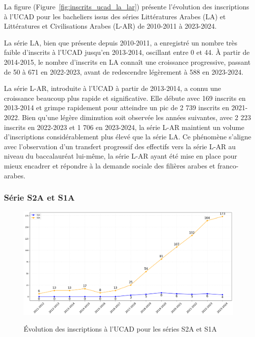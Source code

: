 La figure (Figure~\ref{fig:inscrits_ucad_la_lar}) présente l'évolution des inscriptions à l'UCAD pour les bacheliers issus des séries Littératures Arabes (LA) et Littératures et Civilisations Arabes (L-AR) de 2010-2011 à 2023-2024.

La série LA, bien que présente depuis 2010-2011, a enregistré un nombre très faible d'inscrits à l'UCAD jusqu'en 2013-2014, oscillant entre 0 et 44. 
À partir de 2014-2015, le nombre d'inscrits en LA connaît une croissance progressive, passant de 50 à 671 en 2022-2023, avant de redescendre légèrement à 588 en 2023-2024.

La série L-AR, introduite à l'UCAD à partir de 2013-2014, a connu une croissance beaucoup plus rapide et significative. Elle débute avec 169 inscrits en 2013-2014 et grimpe rapidement pour atteindre un pic de 2 739 inscrits en 2021-2022. 
Bien qu'une légère diminution soit observée les années suivantes, avec 2 223 inscrits en 2022-2023 et 1 706 en 2023-2024, la série L-AR maintient un volume d'inscriptions considérablement plus élevé que la série LA. 
Ce phénomène s'aligne avec l'observation d'un transfert progressif des effectifs vers la série L-AR au niveau du baccalauréat lui-même, la série L-AR ayant été mise en place pour mieux encadrer et répondre à la demande sociale des filières arabes et franco-arabes. 


\newpage
\subsubsection{Série S2A et S1A}

\begin{figure}[ht]
\centering
\caption{Évolution des inscriptions à l'UCAD pour les séries S2A et S1A}
\includegraphics[width=1\textwidth]{figure/Inscrits_ucad_SA.png}
\label{fig:inscrits_ucad_sa}
\end{figure}

